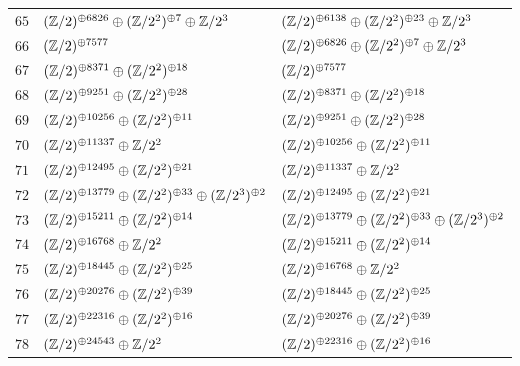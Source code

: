 \begin{supertabular}{|c|p{5.5cm}|p{5.5cm}|}
$65$%
&$(\mathbb{Z}/2)^{\oplus6826}\oplus(\mathbb{Z}/2^{2})^{\oplus7}\oplus\mathbb{Z}/2^{3}$%
&$(\mathbb{Z}/2)^{\oplus6138}\oplus(\mathbb{Z}/2^{2})^{\oplus23}\oplus\mathbb{Z}/2^{3}$\\

$66$%
&$(\mathbb{Z}/2)^{\oplus7577}$%
&$(\mathbb{Z}/2)^{\oplus6826}\oplus(\mathbb{Z}/2^{2})^{\oplus7}\oplus\mathbb{Z}/2^{3}$\\

$67$%
&$(\mathbb{Z}/2)^{\oplus8371}\oplus(\mathbb{Z}/2^{2})^{\oplus18}$%
&$(\mathbb{Z}/2)^{\oplus7577}$\\

$68$%
&$(\mathbb{Z}/2)^{\oplus9251}\oplus(\mathbb{Z}/2^{2})^{\oplus28}$%
&$(\mathbb{Z}/2)^{\oplus8371}\oplus(\mathbb{Z}/2^{2})^{\oplus18}$\\

$69$%
&$(\mathbb{Z}/2)^{\oplus10256}\oplus(\mathbb{Z}/2^{2})^{\oplus11}$%
&$(\mathbb{Z}/2)^{\oplus9251}\oplus(\mathbb{Z}/2^{2})^{\oplus28}$\\

$70$%
&$(\mathbb{Z}/2)^{\oplus11337}\oplus\mathbb{Z}/2^{2}$%
&$(\mathbb{Z}/2)^{\oplus10256}\oplus(\mathbb{Z}/2^{2})^{\oplus11}$\\

$71$%
&$(\mathbb{Z}/2)^{\oplus12495}\oplus(\mathbb{Z}/2^{2})^{\oplus21}$%
&$(\mathbb{Z}/2)^{\oplus11337}\oplus\mathbb{Z}/2^{2}$\\

$72$%
&$(\mathbb{Z}/2)^{\oplus13779}\oplus(\mathbb{Z}/2^{2})^{\oplus33}\oplus(\mathbb{Z}/2^{3})^{\oplus2}$%
&$(\mathbb{Z}/2)^{\oplus12495}\oplus(\mathbb{Z}/2^{2})^{\oplus21}$\\

$73$%
&$(\mathbb{Z}/2)^{\oplus15211}\oplus(\mathbb{Z}/2^{2})^{\oplus14}$%
&$(\mathbb{Z}/2)^{\oplus13779}\oplus(\mathbb{Z}/2^{2})^{\oplus33}\oplus(\mathbb{Z}/2^{3})^{\oplus2}$\\

$74$%
&$(\mathbb{Z}/2)^{\oplus16768}\oplus\mathbb{Z}/2^{2}$%
&$(\mathbb{Z}/2)^{\oplus15211}\oplus(\mathbb{Z}/2^{2})^{\oplus14}$\\

$75$%
&$(\mathbb{Z}/2)^{\oplus18445}\oplus(\mathbb{Z}/2^{2})^{\oplus25}$%
&$(\mathbb{Z}/2)^{\oplus16768}\oplus\mathbb{Z}/2^{2}$\\

$76$%
&$(\mathbb{Z}/2)^{\oplus20276}\oplus(\mathbb{Z}/2^{2})^{\oplus39}$%
&$(\mathbb{Z}/2)^{\oplus18445}\oplus(\mathbb{Z}/2^{2})^{\oplus25}$\\

$77$%
&$(\mathbb{Z}/2)^{\oplus22316}\oplus(\mathbb{Z}/2^{2})^{\oplus16}$%
&$(\mathbb{Z}/2)^{\oplus20276}\oplus(\mathbb{Z}/2^{2})^{\oplus39}$\\

$78$%
&$(\mathbb{Z}/2)^{\oplus24543}\oplus\mathbb{Z}/2^{2}$%
&$(\mathbb{Z}/2)^{\oplus22316}\oplus(\mathbb{Z}/2^{2})^{\oplus16}$\\


\end{supertabular}
